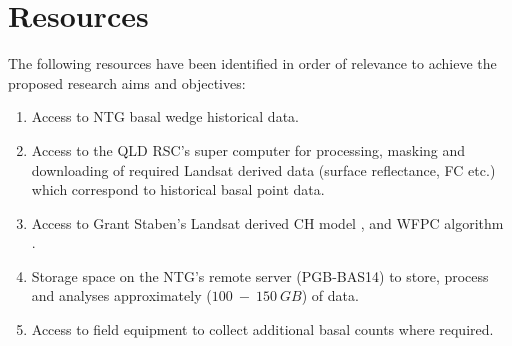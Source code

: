 \newpage
\section{Resources}
The following resources have been identified in order of relevance to achieve the proposed research aims and objectives:

\begin{enumerate}

\item Access to NTG basal wedge historical data.

\item Access to the QLD RSC's super computer for processing, masking and downloading of required Landsat derived data (surface reflectance, FC etc.) which correspond to historical basal point data.
  
\item Access to Grant Staben's Landsat derived CH model \cite{stabenetal2018}, and WFPC algorithm \cite{staben2016}.
  
\item Storage space on the NTG's remote server (PGB-BAS14) to store, process and analyses approximately ($100 \ - \ 150 \ GB$) of data.

\item Access to field equipment to collect additional basal counts where required. 

\end{enumerate}